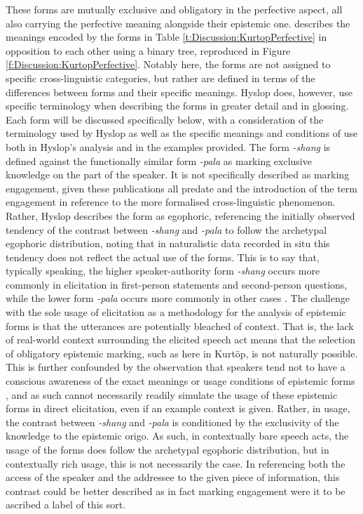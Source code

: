 These forms are mutually exclusive and obligatory in the perfective aspect, all also carrying the perfective meaning alongside their epistemic one. \cites{Hyslop2014}{Hyslop2017}{Hyslop2018} describes the meanings encoded by the forms in Table \ref{t:Discussion:KurtopPerfective} in opposition to each other using a binary tree, reproduced in Figure \ref{f:Discussion:KurtopPerfective}. Notably here, the forms are not assigned to specific cross-linguistic categories, but rather are defined in terms of the differences between forms and their specific meanings. Hyslop does, however, use specific terminology when describing the forms in greater detail and in glossing. Each form will be discussed specifically below, with a consideration of the terminology used by Hyslop as well as the specific meanings and conditions of use both in Hyslop's analysis and in the examples provided.
The form \textit{-shang} is defined against the functionally similar form \textit{-pala} as marking exclusive knowledge on the part of the speaker. It is not specifically described as marking engagement, given these publications all predate  and the introduction of the term engagement in reference to the more formalised cross-linguistic phenomenon. Rather, Hyslop describes the form as egophoric, referencing the initially observed tendency of the contrast between \textit{-shang} and \textit{-pala} to follow the archetypal egophoric distribution, noting that in naturalistic data recorded in situ this tendency does not reflect the actual use of the forms. This is to say that, typically speaking, the higher speaker-authority form \textit{-shang} occurs more commonly in elicitation in first-person statements and second-person questions, while the lower form \textit{-pala} occurs more commonly in other cases \cite[129]{Hyslop2018}. The challenge with the sole usage of elicitation as a methodology for the analysis of epistemic forms is that the utterances are potentially bleached of context. That is, the lack of real-world context surrounding the elicited speech act means that the selection of obligatory epistemic marking, such as here in Kurtöp, is not naturally possible. This is further confounded by the observation that speakers tend not to have a conscious awareness of the exact meanings or usage conditions of epistemic forms \cite{Grzech2020}, and as such cannot necessarily readily simulate the usage of these epistemic forms in direct elicitation, even if an example context is given. Rather, in usage, the contrast between \textit{-shang} and \textit{-pala} is conditioned by the exclusivity of the knowledge to the epistemic origo. As such, in contextually bare speech acts, the usage of the forms does follow the archetypal egophoric distribution, but in contextually rich usage, this is not necessarily the case. In referencing both the access of the speaker and the addressee to the given piece of information, this contrast could be better described as in fact marking engagement were it to be ascribed a label of this sort.

